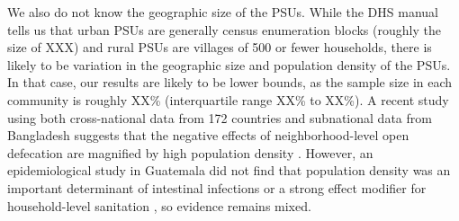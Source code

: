 \documentclass[11pt,a4paper]{article}
\begin{document}
We also do not know the geographic size of the PSUs. While the DHS manual tells us that urban PSUs are generally census enumeration blocks (roughly the size of XXX) and rural PSUs are villages of 500 or fewer households, there is likely to be variation in the geographic size and population density of the PSUs. In that case, our results are likely to be lower bounds, as the sample size in each community is roughly XX\% (interquartile range XX\% to XX\%). A recent study using both cross-national data from 172 countries and subnational data from Bangladesh suggests that the negative effects of neighborhood-level open defecation are magnified by high population density \citep{hathi2017}. However, an epidemiological study in Guatemala did not find that population density was an important determinant of intestinal infections or a strong effect modifier for household-level sanitation \citep{guatemala}, so evidence remains mixed.


\end{document}
